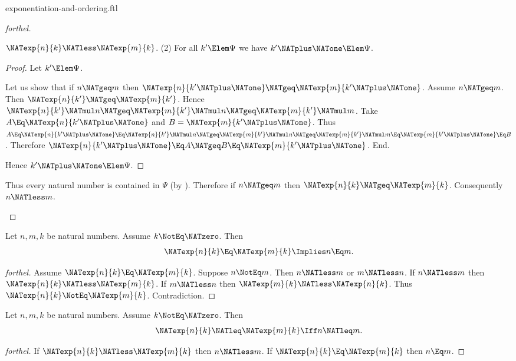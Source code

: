 \documentclass{stex}
\begin{document}
\begin{smodule}{exponentiation-and-ordering.ftl}
\begin{proof}[forthel]
\begin{case}{$\NATexp{n}{k} \NATless \NATexp{m}{k}$.}
    (2) For all $k' \Elem \Psi$ we have $k' \NATplus \NATone \Elem \Psi$.
    \begin{proof}
      Let $k' \Elem \Psi$.

      Let us show that if $n \NATgeq m$ then $\NATexp{n}{k' \NATplus \NATone} \NATgeq \NATexp{m}{k' \NATplus \NATone}$.
        Assume $n \NATgeq m$.
        Then $\NATexp{n}{k'} \NATgeq \NATexp{m}{k'}$.
        Hence $\NATexp{n}{k'} \NATmul n \NATgeq \NATexp{m}{k'} \NATmul n \NATgeq \NATexp{m}{k'} \NATmul m$.
        Take $A \Eq \NATexp{n}{k' \NATplus \NATone}$ and $B = \NATexp{m}{k' \NATplus \NATone}$. %
        Thus $A
          \Eq \NATexp{n}{k' \NATplus \NATone}
          \Eq \NATexp{n}{k'} \NATmul n
          \NATgeq \NATexp{m}{k'} \NATmul n
          \NATgeq \NATexp{m}{k'} \NATmul m
          \Eq \NATexp{m}{k' \NATplus \NATone}
          \Eq B$.
        Therefore $\NATexp{n}{k' \NATplus \NATone} \Eq A \NATgeq B \Eq \NATexp{m}{k' \NATplus \NATone}$.
      End.

      Hence $k' \NATplus \NATone \Elem \Psi$.
    \end{proof}

    Thus every natural number is contained in $\Psi$ (by ).
    Therefore if $n \NATgeq m$ then $\NATexp{n}{k} \NATgeq \NATexp{m}{k}$.
    Consequently $n \NATless m$.
  \end{case}
\end{proof}

\begin{corollary}[forthel]
  Let $n, m, k$ be natural numbers.
  Assume $k \NotEq \NATzero$.
  Then \[ \NATexp{n}{k} \Eq \NATexp{m}{k} \Implies n \Eq m. \]
\end{corollary}
\begin{proof}[forthel]
  Assume $\NATexp{n}{k} \Eq \NATexp{m}{k}$.
  Suppose $n \NotEq m$.
  Then $n \NATless m$ or $m \NATless n$.
  If $n \NATless m$ then $\NATexp{n}{k} \NATless \NATexp{m}{k}$.
  If $m \NATless n$ then $\NATexp{m}{k} \NATless \NATexp{n}{k}$.
  Thus $\NATexp{n}{k} \NotEq \NATexp{m}{k}$.
  Contradiction.
\end{proof}

\begin{corollary}[forthel]
  Let $n, m, k$ be natural numbers.
  Assume $k \NotEq \NATzero$.
  Then \[ \NATexp{n}{k} \NATleq \NATexp{m}{k} \Iff n \NATleq m. \]
\end{corollary}
\begin{proof}[forthel]
  If $\NATexp{n}{k} \NATless \NATexp{m}{k}$ then $n \NATless m$.
  If $\NATexp{n}{k} \Eq \NATexp{m}{k}$ then $n \Eq m$.


\end{proof}
\end{smodule}
\end{document}
